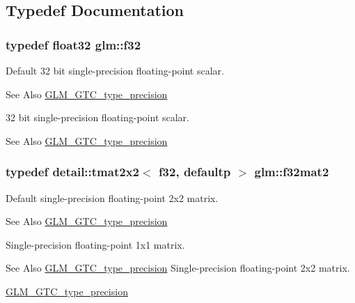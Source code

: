 \subsection{Typedef Documentation}
\hypertarget{group__gtc__type__precision_ga0ec999b57f5330d9021256e96038df04}{
\subsubsection[{f32}]{\setlength{\rightskip}{0pt plus 5cm}typedef float32 {\bf glm\-::f32}}}\label{group__gtc__type__precision_ga0ec999b57f5330d9021256e96038df04}
Default 32 bit single-\/precision floating-\/point scalar. \begin{DoxySeeAlso}{See Also}
\hyperlink{group__gtc__type__precision}{G\-L\-M\-\_\-\-G\-T\-C\-\_\-type\-\_\-precision}
\end{DoxySeeAlso}
32 bit single-\/precision floating-\/point scalar. \begin{DoxySeeAlso}{See Also}
\hyperlink{group__gtc__type__precision}{G\-L\-M\-\_\-\-G\-T\-C\-\_\-type\-\_\-precision} 
\end{DoxySeeAlso}
\hypertarget{group__gtc__type__precision_ga5a8b82f5ef3eb6355640d57466793d9b}{
\subsubsection[{f32mat2}]{\setlength{\rightskip}{0pt plus 5cm}typedef detail\-::tmat2x2$<$ f32, defaultp $>$ {\bf glm\-::f32mat2}}}\label{group__gtc__type__precision_ga5a8b82f5ef3eb6355640d57466793d9b}
Default single-\/precision floating-\/point 2x2 matrix. \begin{DoxySeeAlso}{See Also}
\hyperlink{group__gtc__type__precision}{G\-L\-M\-\_\-\-G\-T\-C\-\_\-type\-\_\-precision}
\end{DoxySeeAlso}
Single-\/precision floating-\/point 1x1 matrix. \begin{DoxySeeAlso}{See Also}
\hyperlink{group__gtc__type__precision}{G\-L\-M\-\_\-\-G\-T\-C\-\_\-type\-\_\-precision} Single-\/precision floating-\/point 2x2 matrix. 

\hyperlink{group__gtc__type__precision}{G\-L\-M\-\_\-\-G\-T\-C\-\_\-type\-\_\-precision} 
\end{DoxySeeAlso}
